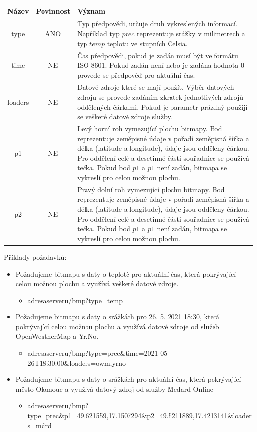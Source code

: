 \documentclass[czech,bachelor,dept460,male,csharp,cpdeclaration]{diploma}
\begin{document}
	\begin{center}
		
		
		\begin{tabular}{c c p{13cm}}
			Název & Povinnost & Význam \\
			\midrule
			type & ANO & Typ předpovědi, určuje druh vykreslených informací. Například typ $prec$ reprezentuje srážky v milimetrech a typ $temp$ teplotu ve stupních Celsia.\\ 
			time & NE & Čas předpovědi, pokud je zadán musí být ve formátu ISO 8601. Pokud zadán není nebo je zadána hodnota 0  provede se předpověď pro aktuální čas.\\ 
			loaders & NE & Datové zdroje které se mají použít. Výběr datových zdroju se provede zadáním zkratek jednotlivých zdrojů oddělených čárkami. Pokud je parametr prázdný použijí se veškeré datové zdroje služby. \\ 
			p1 & NE & Levý horní roh vymezující plochu bitmapy. Bod reprezentuje zeměpisné údaje v pořadí zeměpisná šířka a délka (latitude a longitude), údaje jsou odděleny čárkou. Pro oddělení celé a desetinné části souřadnice se používá tečka. Pokud bod $p1$ a $p1$ není zadán, bitmapa se vykreslí pro celou možnou plochu.\\
			p2 & NE & Pravý dolní roh vymezující plochu bitmapy. Bod reprezentuje zeměpisné údaje v pořadí zeměpisná šířka a délka (latitude a longitude), údaje jsou odděleny čárkou. Pro oddělení celé a desetinné části souřadnice se používá tečka. Pokud bod $p1$ a $p1$ není zadán, bitmapa se vykreslí pro celou možnou plochu.\\
		\end{tabular}
	\end{center}
	
	Příklady požadavků:
	\begin{itemize}
		\item Požadujeme bitmapu s daty o teplotě pro aktuální čas, která pokrývající celou možnou plochu a využívá veškeré datové zdroje.
		\begin{itemize}
			\item adresaserveru/bmp?type=temp
		\end{itemize}
		\item Požadujeme bitmapu s daty o srážkách pro 26. 5. 2021 18:30, která pokrývající celou možnou plochu a využívá datové zdroje od služeb OpenWeatherMap a Yr.No.
		\begin{itemize}
			\item adresaserveru/bmp?type=prec\&time=2021-05-26T18:30:00\&loaders=owm,yrno
		\end{itemize}
		\item Požadujeme bitmapu s daty o srážkách pro aktuální čas, která pokrývající město Olomouc a využívá datový zdroj od služby Medard-Online.
		\begin{itemize}
			\item adresaserveru/bmp?type=prec\&p1=49.621559,17.1507294\&p2=49.5211889,17.4213141\&loaders=mdrd
		\end{itemize}
	\end{itemize}
	
\end{document}
